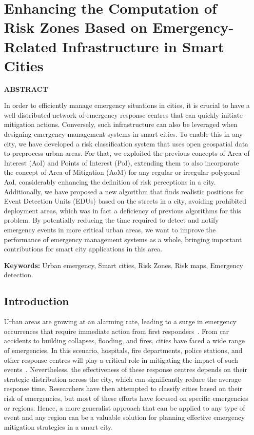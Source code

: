\chapter{Enhancing the Computation of Risk Zones Based on Emergency-Related Infrastructure in Smart Cities}\label{cap:aom}

\begin{refsection}

\textbf{ABSTRACT}

In order to efficiently manage emergency situations in cities, it is crucial to have a well-distributed network of emergency response centres that can quickly initiate mitigation actions. Conversely, such infrastructure can also be leveraged when designing emergency management systems in smart cities. To enable this in any city, we have developed a risk classification system that uses open geospatial data to preprocess urban areas. For that, we exploited the previous concepts of Area of Interest (AoI) and Points of Interest (PoI), extending them to also incorporate the concept of Area of Mitigation (AoM) for any regular or irregular polygonal AoI, considerably enhancing the definition of risk perceptions in a city. Additionally, we have proposed a new algorithm that finds realistic positions for Event Detection Units (EDUs) based on the streets in a city, avoiding prohibited deployment areas, which was in fact a deficiency of previous algorithms for this problem. By potentially reducing the time required to detect and notify emergency events in more critical urban areas, we want to improve the performance of emergency management systems as a whole, bringing important contributions for smart city applications in this area.

\textbf{Keywords:} Urban emergency, Smart cities, Risk Zones, Risk maps, Emergency detection.

\section{Introduction}\label{sec:intro}

Urban areas are growing at an alarming rate, leading to a surge in emergency occurrences that require immediate action from first responders~\cite{Costa_2022}. From car accidents to building collapses, flooding, and fires, cities have faced a wide range of emergencies. In this scenario, hospitals, fire departments, police stations, and other response centres will play a critical role in mitigating the impact of such events~\cite{emergencies4,emergencies5}. Nevertheless, the effectiveness of these response centres depends on their strategic distribution across the city, which can significantly reduce the average response time. Researchers have then attempted to classify cities based on their risk of emergencies, but most of these efforts have focused on specific emergencies or regions. Hence, a more generalist approach that can be applied to any type of event and any region can be a valuable solution for planning effective emergency mitigation strategies in a smart city.


\end{refsection}
